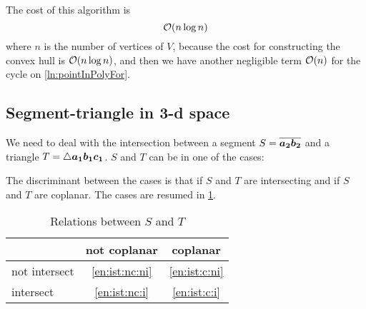 \documentclass[dissertation.tex]{subfiles}
\begin{document}
The cost of this algorithm is
\begin{equation*}
  \mathcal{O}(n\log n)
\end{equation*}
where $n$ is the number of vertices of $V$, because the cost for
constructing the convex hull is \cite{deberg} $\mathcal{O}(n\log n)$, and
then we have another negligible term $\mathcal{O}(n)$ for the cycle on \cref{ln:pointInPolyFor}.

\subsection{Segment-triangle in 3-d space}\label{sec:intersectionST}
We need to deal with the intersection between a segment
$S=\overline{\boldsymbol{a_2}\boldsymbol{b_2}}$ and a triangle
$T=\triangle\boldsymbol{a_1}\boldsymbol{b_1}\boldsymbol{c_1}$. $S$ and $T$ can be in one of
the cases:
The discriminant between the cases is that if $S$ and $T$ are
intersecting and if $S$ and $T$ are coplanar. The cases are resumed in
\cref{tab:intersectSegmentTriang}.
\begin{table}
  \centering
  \begin{tabular}{l|cc}
    &not coplanar&coplanar\\
    \hline
    not intersect& \cref{en:ist:nc:ni} & \cref{en:ist:c:ni}\\
    intersect& \cref{en:ist:nc:i} & \cref{en:ist:c:i}\\
  \end{tabular}
  \caption{Relations between $S$ and $T$}
  \label{tab:intersectSegmentTriang}
\end{table}
\end{document}

